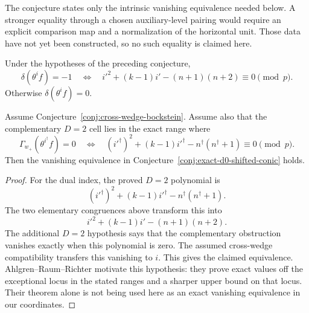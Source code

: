 The conjecture states only the intrinsic vanishing equivalence needed
below.  A stronger equality through a chosen auxiliary-level pairing would
require an explicit comparison map and a normalization of the horizontal
unit.  Those data have not yet been constructed, so no such equality is
claimed here.

\begin{conjecture}[Exact $D=0$ shifted-conic law]
\label{conj:exact-d0-shifted-conic}
Under the hypotheses of the preceding conjecture,
\[
 \delta(\theta^i f)=-1
 \quad\Longleftrightarrow\quad
 i'^2+(k-1)i'-(n+1)(n+2)\equiv0\pmod p.
\]
Otherwise $\delta(\theta^i f)=0$.
\end{conjecture}

\begin{proposition}
\label{prop:conditional-shifted-conic}
Assume Conjecture~\ref{conj:cross-wedge-bockstein}.  Assume also that the
complementary $D=2$ cell lies in the exact range where
\[
 \Gamma_{w_+}(\theta^{i^\dagger}f)=0
 \quad\Longleftrightarrow\quad
 (i'^\dagger)^2+(k-1)i'^\dagger
   -n^\dagger(n^\dagger+1)\equiv0\pmod p.
\]
Then the vanishing equivalence in
Conjecture~\ref{conj:exact-d0-shifted-conic} holds.
\end{proposition}

\begin{proof}
For the dual index, the proved $D=2$ polynomial is
\[
 (i'^\dagger)^2+(k-1)i'^\dagger
   -n^\dagger(n^\dagger+1).
\]
The two elementary congruences above transform this into
\[
 i'^2+(k-1)i'-(n+1)(n+2).
\]
The additional $D=2$ hypothesis says that the complementary obstruction
vanishes exactly when this polynomial is zero.  The assumed cross-wedge
compatibility transfers this vanishing to $i$.  This gives the claimed
equivalence.  Ahlgren--Raum--Richter \cite[Theorem~C]{ARR2026} motivate
this hypothesis: they prove exact values off the exceptional locus in the
stated ranges and a sharper upper bound on that locus.  Their theorem alone
is not being used here as an exact vanishing equivalence in our coordinates.
\end{proof}
